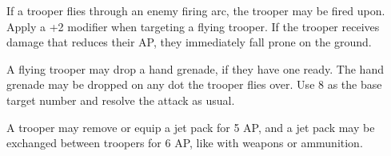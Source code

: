 If a trooper flies through an enemy firing arc, the trooper may be fired upon.
Apply a +2 modifier when targeting a flying trooper.
If the trooper receives damage that reduces their AP, they immediately fall prone on the ground.

A flying trooper may drop a hand grenade, if they have one ready.
The hand grenade may be dropped on any dot the trooper flies over.
Use 8 as the base target number and resolve the attack as usual.

A trooper may remove or equip a jet pack for 5 AP, and a jet pack may be exchanged between troopers for 6 AP, like with weapons or ammunition.
